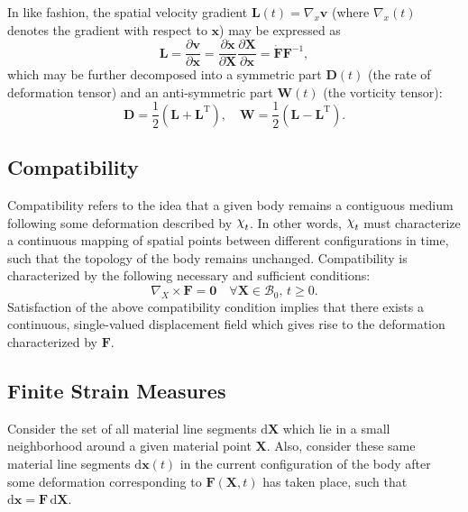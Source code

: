 In like fashion, the spatial velocity gradient $\bm{L} (t) = \nabla_x \bm{v}$ (where $\nabla_x(t)$ denotes the gradient with respect to $\bm{x}$) may be expressed as
\begin{equation}
  \bm{L} = \frac{\partial \bm{v}}{\partial \bm{x}} = \frac{\partial \dot{\bm{x}}}{\partial \bm{X}} \frac{\partial \bm{X}}{\partial \bm{x}} = \dot{\bm{F}} \bm{F}^{-1},
\end{equation}
which may be further decomposed into a symmetric part $\bm{D}(t)$ (the rate of deformation tensor) and an anti-symmetric part $\bm{W}(t)$ (the vorticity tensor):
\begin{equation}
  \bm{D} = \frac{1}{2} (\bm{L} + \bm{L}^{\mathrm T}), \quad \bm{W} = \frac{1}{2} (\bm{L} - \bm{L}^{\mathrm T}).
\end{equation}

\subsection*{Compatibility}

Compatibility refers to the idea that a given body remains a contiguous medium following some deformation described by $\raisebox{\depth}{$\chi$}_t$. In other words, $\raisebox{\depth}{$\chi$}_t$ must characterize a continuous mapping of spatial points between different configurations in time, such that the topology of the body remains unchanged. Compatibility is characterized by the following necessary and sufficient conditions:
\begin{equation}
  \nabla_X \times \bm{F} = \bm{0} \quad \forall \bm{X} \in \mathcal{B}_0, \, t \geq 0.
  \label{eq:compatibility}
\end{equation}
Satisfaction of the above compatibility condition implies that there exists a continuous, single-valued displacement field which gives rise to the deformation characterized by $\bm{F}$.

\subsection*{Finite Strain Measures}

Consider the set of all material line segments $\mathrm d \bm{X}$ which lie in a small neighborhood around a given material point $\bm{X}$. Also, consider these same material line segments $\mathrm d \bm{x}(t)$ in the current configuration of the body after some deformation corresponding to $\bm{F} (\bm{X}, t)$ has taken place, such that $\mathrm d \bm{x} = \bm{F} \, \mathrm d \bm{X}$.

